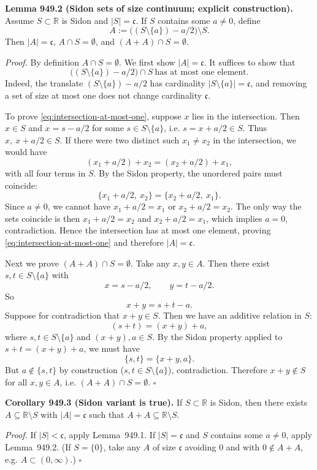 \medskip
\noindent\textbf{Lemma 949.2 (Sidon sets of size continuum; explicit construction).}
Assume $S\subset\mathbb R$ is Sidon and $|S|=\mathfrak c$. If $S$ contains some $a\ne 0$, define
\[
A:=\bigl((S\setminus\{a\})-a/2\bigr)\setminus S.
\]
Then $|A|=\mathfrak c$, $A\cap S=\emptyset$, and $(A+A)\cap S=\emptyset$.

\medskip
\noindent\emph{Proof.}
By definition $A\cap S=\emptyset$.
We first show $|A|=\mathfrak c$.
It suffices to show that
\begin{equation}\label{eq:intersection-at-most-one}
\bigl((S\setminus\{a\})-a/2\bigr)\cap S
\ \text{has at most one element}.
\end{equation}
Indeed, the translate $(S\setminus\{a\})-a/2$ has cardinality $|S\setminus\{a\}|=\mathfrak c$, and removing a set of size at most one does not change cardinality $\mathfrak c$.

To prove \eqref{eq:intersection-at-most-one}, suppose $x$ lies in the intersection.
Then $x\in S$ and $x=s-a/2$ for some $s\in S\setminus\{a\}$, i.e. $s=x+a/2\in S$.
Thus $x,\ x+a/2\in S$.
If there were two distinct such $x_1\ne x_2$ in the intersection, we would have
\[
(x_1+a/2)+x_2 = (x_2+a/2)+x_1,
\]
with all four terms in $S$.
By the Sidon property, the unordered pairs must coincide:
\[
\{x_1+a/2,\ x_2\}=\{x_2+a/2,\ x_1\}.
\]
Since $a\ne 0$, we cannot have $x_1+a/2=x_1$ or $x_2+a/2=x_2$.
The only way the sets coincide is then $x_1+a/2=x_2$ and $x_2+a/2=x_1$, which implies $a=0$, contradiction.
Hence the intersection has at most one element, proving \eqref{eq:intersection-at-most-one} and therefore $|A|=\mathfrak c$.

Next we prove $(A+A)\cap S=\emptyset$.
Take any $x,y\in A$.
Then there exist $s,t\in S\setminus\{a\}$ with
\[
x=s-a/2,\qquad y=t-a/2.
\]
So
\[
x+y = s+t-a.
\]
Suppose for contradiction that $x+y\in S$.
Then we have an additive relation in $S$:
\[
(s+t) = (x+y)+a,
\]
where $s,t\in S\setminus\{a\}$ and $(x+y),a\in S$.
By the Sidon property applied to $s+t=(x+y)+a$, we must have
\[
\{s,t\}=\{x+y,a\}.
\]
But $a\notin\{s,t\}$ by construction ($s,t\in S\setminus\{a\}$), contradiction.
Therefore $x+y\notin S$ for all $x,y\in A$, i.e. $(A+A)\cap S=\emptyset$.
\hfill $\square$

\medskip
\noindent\textbf{Corollary 949.3 (Sidon variant is true).}
If $S\subset\mathbb R$ is Sidon, then there exists $A\subseteq\mathbb R\setminus S$ with $|A|=\mathfrak c$ such that $A+A\subseteq\mathbb R\setminus S$.

\medskip
\noindent\emph{Proof.}
If $|S|<\mathfrak c$, apply Lemma~949.1.
If $|S|=\mathfrak c$ and $S$ contains some $a\ne0$, apply Lemma~949.2.
(If $S=\{0\}$, take any $A$ of size $\mathfrak c$ avoiding $0$ and with $0\notin A+A$, e.g. $A\subset (0,\infty)$.)
\hfill $\square$

